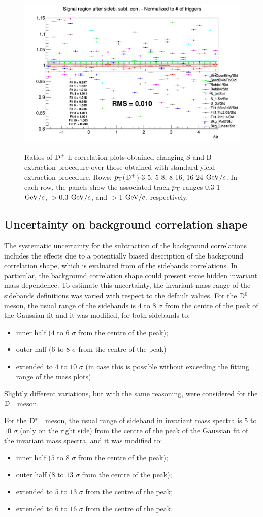 \begin{figure}
{\includegraphics[width=0.31\linewidth]{figures/Systematics/Dplus/Yield/Ratio_AzimCorrDistr_Dplus_Canvas_PtIntBins13to13_PoolInt_thr1dotto99dot.png}}
\caption{Ratios of ${\rm D^+}$-h correlation plots obtained changing S and B extraction procedure over those obtained with standard yield extraction procedure. Rows: $p_{\rm T}$(${\rm D^+}$) 3-5, 5-8, 8-16, 16-24 $\mathrm{GeV}/c$. In each row, the panels show the associated track $p_{\rm T}$ ranges 0.3-1 $\mathrm{GeV}/c$, $>$0.3 $\mathrm{GeV}/c$, and $>$1 $\mathrm{GeV}/c$, respectively.}
\label{fig:Syst_DplusYield}
\end{figure}




\subsection{Uncertainty on background correlation shape}
The systematic uncertainty for the subtraction of the background correlations includes the effects due to a potentially biased description of the background correlation shape, which is evaluated from of the sidebands correlations. In particular, the background correlation shape could present some hidden invariant mass dependence. To estimate this uncertainty, the invariant mass range of the sidebands definitions was varied with respect to the default values. For the ${\rm D^0}$ meson, the usual range of the sidebands is $4$ to $8$ $\sigma$ from the centre of the peak of the Gaussian fit and it was modified, for both sidebands to:
\begin{itemize}
    \item inner half ($4$ to $6$ $\sigma$ from the centre of the peak);
    \item outer half ($6$ to $8$ $\sigma$ from the centre of the peak)
    \item extended to $4$ to $10$ $\sigma$ (in case this is possible without exceeding the fitting range of the mass plots)
\end{itemize}

Slightly different variations, but with the same reasoning, were considered for the ${\rm D^+}$ meson.

For the ${\rm D^{*+}}$ meson, the usual range of sideband in invariant mass spectra is $5$ to $10$ $\sigma$ (only on the right side) from the centre of the peak of the Gaussian fit of the invariant mass spectra,  and it was modified to:
\begin{itemize}
    \item inner half ($5$ to $8$ $\sigma$ from the centre of the peak);
    \item outer half ($8$ to $13$ $\sigma$ from the centre of the peak);
    \item extended to $5$ to $13$ $\sigma$ from the centre of the peak;
     \item extended to $6$ to $16$ $\sigma$ from the centre of the peak.
\end{itemize}

